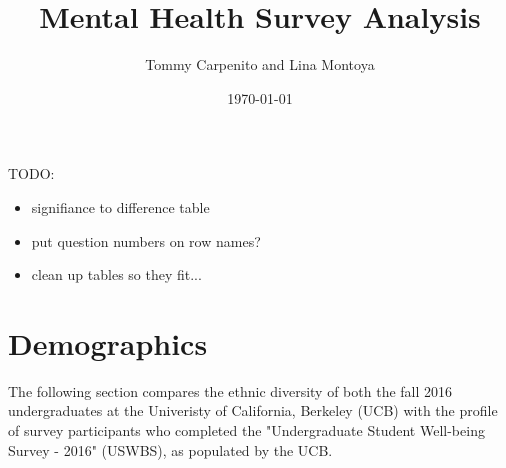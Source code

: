 \documentclass{article}\usepackage[]{graphicx}\usepackage[]{color}
\title{Mental Health Survey Analysis}
\author{Tommy Carpenito and Lina Montoya}
\date{\today}
\begin{document}
\maketitle
\tableofcontents

\pagebreak

TODO:

\begin{itemize}
\item signifiance to difference table
\item put question numbers on row names?
\item clean up tables so they fit...
\end{itemize}

\section{Demographics}
The following section compares the ethnic diversity of both the fall 2016 undergraduates at the Univeristy of California, Berkeley (UCB) with the profile of survey participants who completed the "Undergraduate Student Well-being Survey - 2016" (USWBS), as populated by the UCB.
\end{document}
